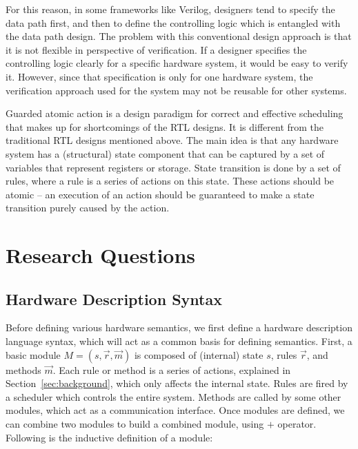 For this reason, in some frameworks like Verilog, designers tend to
specify the data path first, and then to define the controlling logic
which is entangled with the data path design. The problem with this
conventional design approach is that it is not flexible in perspective
of verification. If a designer specifies the controlling logic clearly
for a specific hardware system, it would be easy to verify
it. However, since that specification is only for one hardware system,
the verification approach used for the system may not be reusable for
other systems.

Guarded atomic action is a design paradigm for correct and effective
scheduling that makes up for shortcomings of the RTL designs. It is
different from the traditional RTL designs mentioned above. The main
idea is that any hardware system has a (structural) state component
that can be captured by a set of variables that represent registers or
storage. State transition is done by a set of rules, where a rule is a
series of actions on this state. These actions should be atomic -- an
execution of an action should be guaranteed to make a state transition
purely caused by the action.

\section{Research Questions}

\subsection{Hardware Description Syntax}

\newcommand{\Mod}{\ensuremath{M}}
\newcommand{\ModC}[3]{\ensuremath{(#1, #2, #3)}}
\newcommand{\ModP}{\ensuremath{+}}
\newcommand{\Sem}[1]{\ensuremath{\llbracket #1 \rrbracket}}

Before defining various hardware semantics, we first define a hardware
description language syntax, which will act as a common basis for
defining semantics. First, a basic module $\Mod{} =
\ModC{s}{\vec{r}}{\vec{m}}$ is composed of (internal) state $s$, rules
$\vec{r}$, and methods $\vec{m}$. Each rule or method is a series of
actions, explained in Section~\ref{sec:background}, which only affects
the internal state. Rules are fired by a scheduler which controls the
entire system. Methods are called by some other modules, which act as
a communication interface. Once modules are defined, we can combine
two modules to build a combined module, using \ModP{}
operator. Following is the inductive definition of a module:

